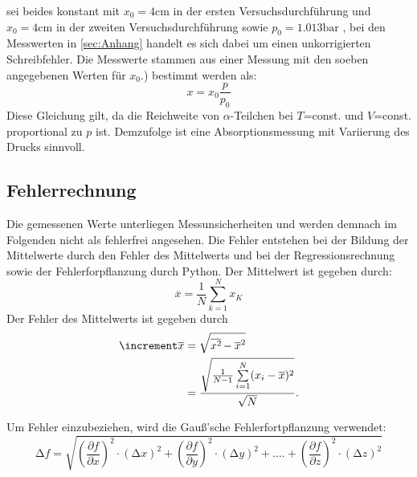 sei beides konstant mit $x_0 = 4 \unit{\centi\meter}$ in der ersten Versuchsdurchführung 
und $x_0 = 4 \unit{\centi\meter}$ in der zweiten Versuchsdurchführung sowie
$p_0 = 1.013 \unit{\bar}$ \cite{normaldruck}, bei den Messwerten in \autoref{sec:Anhang} 
handelt es sich dabei um einen unkorrigierten Schreibfehler. Die Messwerte stammen 
aus einer Messung mit den soeben angegebenen Werten für $x_0$.) bestimmt werden
als:
\begin{equation}
    \label{eqn:4}
    x = x_0 \frac{p}{p_0}
\end{equation}
Diese Gleichung gilt, da die Reichweite von $\alpha$-Teilchen bei $T$=const. und 
$V$=const. proportional zu $p$ ist. Demzufolge ist eine Absorptionsmessung mit 
Variierung des Drucks sinnvoll.
\cite{anleitung11}

\subsection{Fehlerrechnung}
\label{subsec:fehler}
Die gemessenen Werte unterliegen Messunsicherheiten und werden demnach im
Folgenden nicht als fehlerfrei angesehen. Die Fehler entstehen bei der
Bildung der Mittelwerte durch den Fehler des Mittelwerts und bei der
Regressionsrechnung sowie der Fehlerforpflanzung durch Python.
Der Mittelwert ist gegeben durch:
\begin{equation}
    \overline{x} = \frac{1}{N} \sum\limits_{k=1}^N x_K
\end{equation}
Der Fehler des Mittelwerts ist gegeben durch 
\begin{equation}
    \begin{aligned}
        \increment \overline{x} &= \sqrt{\overline{x^2\kern-0.1em} - \overline{x}^2} \\
                            &= \frac{\sqrt{\frac{1}{N-1} \sum\limits_{i=1}^N (x_i - \overline{x})^2}}{\sqrt{N}}.
    \end{aligned}
\end{equation}

Um Fehler einzubeziehen, wird die Gauß'sche Fehlerfortpflanzung verwendet:
\begin{equation}
    \label{eqn:9}
    \increment f = \sqrt{\left(\frac{\partial f}{\partial x}\right)^2 \cdot \left(\increment x\right)^2 + \left(\frac{\partial f}{\partial y}\right)^2 \cdot \left(\increment y\right)^2 + .... + \left(\frac{\partial f}{\partial z}\right)^2 \cdot \left(\increment z\right)^2}
\end{equation}